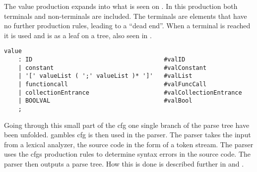 The value production expands into what is seen on .
In this production both terminals and non-terminals are included.
The terminals are elements that have no further production rules, leading to a ``dead end''.
When a terminal is reached it is used and is as a leaf on a tree, also seen in .
\begin{lstlisting}[caption={\acrshort{cfg} Value},frame=tlrb,label={lst:value},numbers=none]
value
    : ID                                     #valID
    | constant                               #valConstant
    | '[' valueList ( ';' valueList )* ']'   #valList
    | functioncall                           #valFuncCall
    | collectionEntrance                     #valCollectionEntrance
    | BOOLVAL                                #valBool
    ;
\end{lstlisting}

Going through this small part of the \acrshort{cfg} one single branch of the parse tree have been unfolded.
\gls{gamble}s \acrshort{cfg} is then used in the parser.
The parser takes the input from a lexical analyzer, the source code in the form of a token stream.
The parser uses the \acrshort{cfg}s production rules to determine syntax errors in the source code.
The parser then outputs a parse tree.
How this is done is described further in  and .
